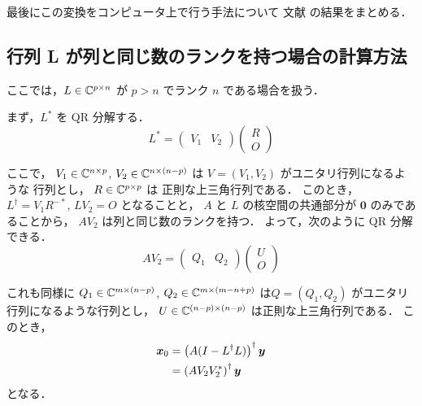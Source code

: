 最後にこの変換をコンピュータ上で行う手法について
文献 \cite{Elden1982, Hansen1994} の結果をまとめる．

\subsection{行列 L が列と同じ数のランクを持つ場合の計算方法}

ここでは，$L \in \mathbb{C}^{p \times n}$ が $p > n$ でランク $n$ である場合を扱う．

まず，$L^*$ を QR 分解する．
\begin{equation}
    L^* = \begin{pmatrix}
        V_1 & V_2
    \end{pmatrix}\begin{pmatrix}
        R \\ O
    \end{pmatrix}
\end{equation}

ここで，
$V_1 \in \mathbb{C}^{n \times p}$,
$V_2 \in \mathbb{C}^{n \times (n-p)}$
は $V = (V_1, V_2)$ がユニタリ行列になるような
行列とし，
$R \in \mathbb{C}^{p \times p}$ は
正則な上三角行列である．
このとき，$L^\dagger = V_1 R^{-*}$, $LV_2 = O$ となることと，
$A$ と $L$ の核空間の共通部分が $\bm{0}$ のみであることから，
$AV_2$ は列と同じ数のランクを持つ．
よって，次のように QR 分解できる．
\begin{equation}
    AV_2 = \begin{pmatrix}
        Q_1 & Q_2
    \end{pmatrix}\begin{pmatrix}
        U \\ O
    \end{pmatrix}
\end{equation}

これも同様に
$Q_1 \in \mathbb{C}^{m \times (n-p)}$,
$Q_2 \in \mathbb{C}^{m \times (m-n+p)}$
は$Q = (Q_1, Q_2)$ がユニタリ行列になるような行列とし，
$U \in \mathbb{C}^{(n - p) \times (n - p)}$
は正則な上三角行列である．
このとき，
\begin{align}
    \bm{x}_0 & = \left(A (I - L^\dagger L)\right)^\dagger \bm{y} \notag \\
             & = \left(A V_2 V_2^*\right)^\dagger \bm{y}
\end{align}
となる．

